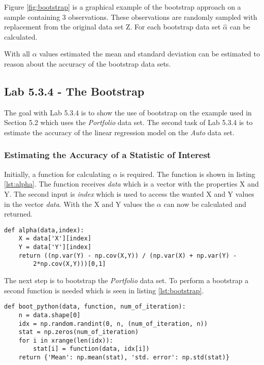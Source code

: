 
Figure \ref{fig:bootstrap} is a graphical example of the bootstrap approach on a sample containing 3 observations. These observations are randomly sampled with replacement from the original data set Z. For each bootstrap data set $\hat{\alpha}$ can be calculated.

With all $\alpha$ values estimated the mean and standard deviation can be estimated to reason about the accuracy of the bootstrap data sets.

\subsection{Lab 5.3.4 - The Bootstrap}

The goal with Lab 5.3.4 is to show the use of bootstrap on the example used in Section 5.2 \citep[pp. 187-190]{ISLR} which uses the \emph{Portfolio} data set. The second task of Lab 5.3.4 is to estimate the accuracy of the linear regression model on the \emph{Auto} data set.

\subsubsection{Estimating the Accuracy of a Statistic of Interest}

Initially, a function for calculating $\alpha$ is required. The function is shown in listing \ref{lst:alpha}. The function receives \emph{data} which is a vector with the properties X and Y. The second input is \emph{index} which is used to access the wanted X and Y values in the vector \emph{data}.
With the X and Y values the $\alpha$ can now be calculated and returned.

\begin{lstlisting}[caption={Function for calculating $\alpha$ in python}, label=lst:alpha, mathescape=true]
def alpha(data,index):
	X = data['X'][index]
	Y = data['Y'][index]
	return ((np.var(Y) - np.cov(X,Y)) / (np.var(X) + np.var(Y) - 
		2*np.cov(X,Y)))[0,1]
\end{lstlisting}

The next step is to bootstrap the \emph{Portfolio} data set.
To perform a bootstrap a second function is needed which is seen in listing \ref{lst:bootstrap}.

\begin{lstlisting}[caption={Bootstrap function in python}, label=lst:bootstrap, mathescape=true]
def boot_python(data, function, num_of_iteration):
	n = data.shape[0]
	idx = np.random.randint(0, n, (num_of_iteration, n))
	stat = np.zeros(num_of_iteration)
	for i in xrange(len(idx)):
		stat[i] = function(data, idx[i])
	return {'Mean': np.mean(stat), 'std. error': np.std(stat)}
\end{lstlisting}

